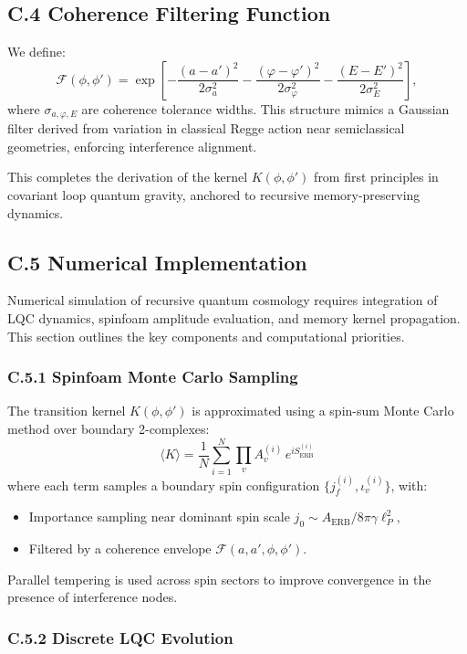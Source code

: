 \subsection*{C.4 Coherence Filtering Function}

We define:
\[
\mathcal{F}(\phi, \phi') = \exp\left[-\frac{(a - a')^2}{2\sigma_a^2} - \frac{(\varphi - \varphi')^2}{2\sigma_\varphi^2} - \frac{(E - E')^2}{2\sigma_E^2}\right],
\]
where \(\sigma_{a,\varphi,E}\) are coherence tolerance widths. This structure mimics a Gaussian filter derived from variation in classical Regge action near semiclassical geometries, enforcing interference alignment.

This completes the derivation of the kernel \( K(\phi, \phi') \) from first principles in covariant loop quantum gravity, anchored to recursive memory-preserving dynamics.
\subsection*{C.5 Numerical Implementation}
\label{appendix:C5}

Numerical simulation of recursive quantum cosmology requires integration of LQC dynamics, spinfoam amplitude evaluation, and memory kernel propagation. This section outlines the key components and computational priorities.

\subsubsection*{C.5.1 Spinfoam Monte Carlo Sampling}

The transition kernel \( K(\phi, \phi') \) is approximated using a spin-sum Monte Carlo method over boundary 2-complexes:
\begin{equation}
\langle K \rangle = \frac{1}{N} \sum_{i=1}^N \prod_v A_v^{(i)} \, e^{i S_{\text{ERB}}^{(i)}}
\end{equation}
where each term samples a boundary spin configuration \( \{j_f^{(i)}, \iota_v^{(i)}\} \), with:
\begin{itemize}
  \item Importance sampling near dominant spin scale \( j_0 \sim A_{\text{ERB}}/8\pi\gamma\ell_P^2 \),
  \item Filtered by a coherence envelope \( \mathcal{F}(a, a', \phi, \phi') \).
\end{itemize}
Parallel tempering is used across spin sectors to improve convergence in the presence of interference nodes.

\subsubsection*{C.5.2 Discrete LQC Evolution}

